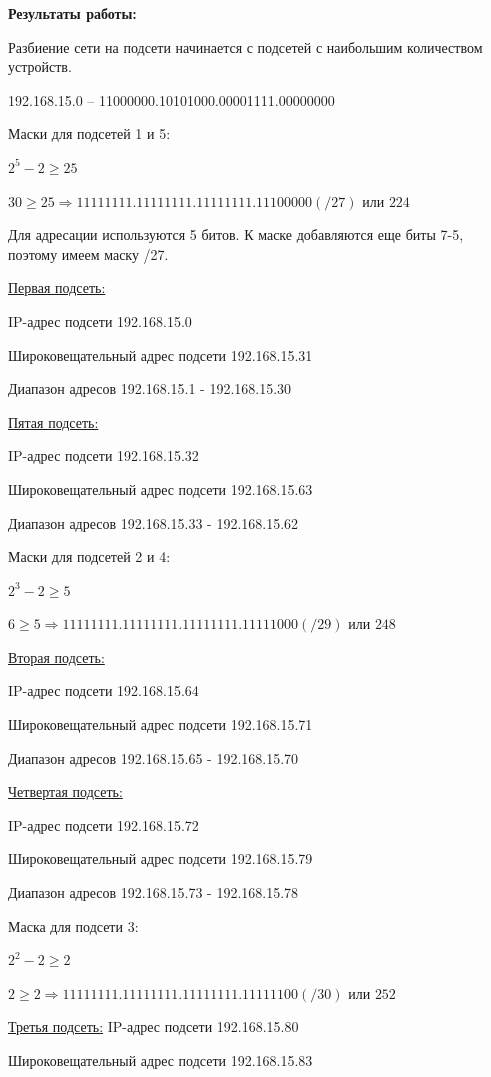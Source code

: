 \documentclass[a4paper,14pt]{extreport} %
\begin{document}
\textbf{Результаты работы:}

Разбиение сети на подсети начинается с подсетей с наибольшим количеством устройств. 

192.168.15.0 – 11000000.10101000.00001111.00000000

Маски для подсетей 1 и 5:

$ 2^{5} - 2 \geq 25 $

$ 30 \geq 25 \Longrightarrow 11111111.11111111.11111111.11100000 (/27)$ или $ 224 $

Для адресации используются 5 битов.
К маске  добавляются еще биты 7-5, поэтому имеем маску /27.

\underline{Первая подсеть:}

IP-адрес подсети 192.168.15.0

Широковещательный адрес подсети 192.168.15.31

Диапазон адресов 192.168.15.1 - 192.168.15.30

\underline{Пятая подсеть:}

IP-адрес подсети 192.168.15.32

Широковещательный адрес подсети 192.168.15.63

Диапазон адресов 192.168.15.33 - 192.168.15.62

Маски для подсетей 2 и 4:

$ 2^{3} - 2 \geq 5 $

$ 6 \geq 5 \Longrightarrow 11111111.11111111.11111111.11111000 (/29)$ или $ 248 $

\underline{Вторая подсеть:}

IP-адрес подсети 192.168.15.64

Широковещательный адрес подсети 192.168.15.71

Диапазон адресов 192.168.15.65 - 192.168.15.70

\underline{Четвертая подсеть:}

IP-адрес подсети 192.168.15.72

Широковещательный адрес подсети 192.168.15.79

Диапазон адресов 192.168.15.73 - 192.168.15.78

Маска для подсети 3:

$ 2^{2} - 2 \geq 2 $

$ 2 \geq 2 \Longrightarrow 11111111.11111111.11111111.11111100 (/30)$ или $ 252 $

\underline{Третья подсеть:}
IP-адрес подсети 192.168.15.80

Широковещательный адрес подсети 192.168.15.83
\end{document}
